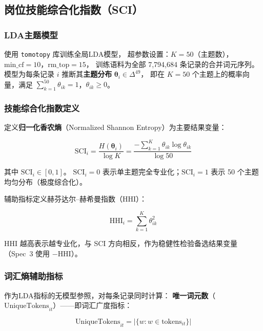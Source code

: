 \documentclass[12pt,a4paper]{ctexart}
\begin{document}
\subsection{岗位技能综合化指数（SCI）}

\subsubsection{LDA主题模型}

使用 \texttt{tomotopy} 库训练全局LDA模型，
超参数设置：$K = 50$（主题数），$\text{min\_cf} = 10$，$\text{rm\_top} = 15$，
训练语料为全部 7,794,684 条记录的合并词元序列。
模型为每条记录 $i$ 推断其\textbf{主题分布} $\boldsymbol{\theta}_i \in \Delta^{49}$，
即在 $K=50$ 个主题上的概率向量，满足 $\sum_{k=1}^{50} \theta_{ik} = 1$，$\theta_{ik} \geq 0$。

\subsubsection{技能综合化指数定义}

定义\textbf{归一化香农熵}（Normalized Shannon Entropy）为主要结果变量：

\begin{equation}
\label{eq:entropy}
\text{SCI}_i = \frac{H(\boldsymbol{\theta}_i)}{\log K} = \frac{-\sum_{k=1}^{K} \theta_{ik} \log \theta_{ik}}{\log 50}
\end{equation}

其中 $\text{SCI}_i \in [0, 1]$。
$\text{SCI}_i = 0$ 表示单主题完全专业化；$\text{SCI}_i = 1$ 表示 50 个主题均匀分布（极度综合化）。

辅助指标定义赫芬达尔--赫希曼指数（HHI）：

\begin{equation}
\text{HHI}_i = \sum_{k=1}^{K} \theta_{ik}^2
\end{equation}

HHI 越高表示越专业化，与 SCI 方向相反，作为稳健性检验备选结果变量（Spec~3 使用 $-\text{HHI}$）。

\subsubsection{词汇熵辅助指标}

作为LDA指标的无模型参照，对每条记录同时计算：
\textbf{唯一词元数}（$\text{UniqueTokens}_{it}$）——即词汇广度指标：

\begin{equation}
\text{UniqueTokens}_{it} = \bigl|\{w : w \in \text{tokens}_{it}\}\bigr|
\end{equation}
\end{document}

